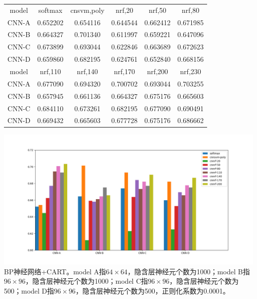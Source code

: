 \begin{center}
\begin{tabular}{cccccc}
\toprule[2pt] 
model & softmax  & cnsvm,poly & nrf,20 & nrf,50 & nrf,80 \\ 
CNN-A & 0.652202 & 0.654116 & 0.644544 & 0.662412 & 0.671985 \\ 
CNN-B & 0.664327 & 0.701340 & 0.611997 & 0.659221 & 0.647096 \\ 
CNN-C & 0.673899 & 0.693044 & 0.622846 & 0.663689 & 0.672623 \\ 
CNN-D & 0.659860 & 0.682195 & 0.624761 & 0.652840 & 0.668156 \\ 
\midrule[2pt]
model & nrf,110 & nrf,140 & nrf,170 & nrf,200 & nrf,230 \\ 
CNN-A & 0.677090 & 0.694320 & 0.700702 & 0.693044 & 0.703255 \\ 
CNN-B & 0.657945 & 0.661136 & 0.664327 & 0.675176 & 0.665603 \\  
CNN-C & 0.684110 & 0.673261 & 0.682195 & 0.677090 & 0.690491 \\ 
CNN-D & 0.669432 & 0.665603 & 0.677728 & 0.675176 & 0.686662 \\ 
\bottomrule[2pt]
\end{tabular} 
\end{center}


\begin{center}
\includegraphics[scale=0.5]{../figures/CNN_rf1.png} \\
BP神经网络+CART。model A指$64\times64$，隐含层神经元个数为1000；model B指$96\times96$，隐含层神经元个数为1000；model C指$96\times96$，隐含层神经元个数为500；model D指$96\times96$，隐含层神经元个数为500，正则化系数为0.0001。
\end{center}
